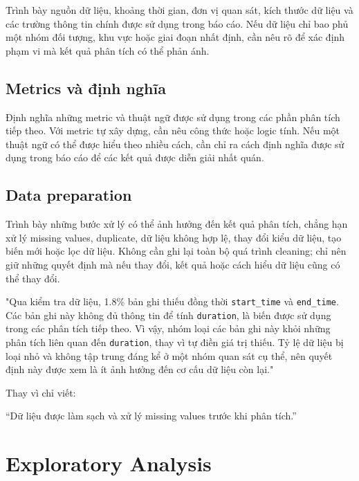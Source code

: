 \documentclass[12pt]{eDA_conquer2026}
\begin{document}
Trình bày nguồn dữ liệu, khoảng thời gian, đơn vị quan sát, kích thước dữ liệu và các trường thông tin chính được sử dụng trong báo cáo. Nếu dữ liệu chỉ bao phủ một nhóm đối tượng, khu vực hoặc giai đoạn nhất định, cần nêu rõ để xác định phạm vi mà kết quả phân tích có thể phản ánh.

\subsection*{Metrics và định nghĩa}

Định nghĩa những metric và thuật ngữ được sử dụng trong các phần phân tích tiếp theo. Với metric tự xây dựng, cần nêu công thức hoặc logic tính. Nếu một thuật ngữ có thể được hiểu theo nhiều cách, cần chỉ ra cách định nghĩa được sử dụng trong báo cáo để các kết quả được diễn giải nhất quán.

\subsection*{Data preparation}

Trình bày những bước xử lý có thể ảnh hưởng đến kết quả phân tích, chẳng hạn xử lý missing values, duplicate, dữ liệu không hợp lệ, thay đổi kiểu dữ liệu, tạo biến mới hoặc lọc dữ liệu. Không cần ghi lại toàn bộ quá trình cleaning; chỉ nên giữ những quyết định mà nếu thay đổi, kết quả hoặc cách hiểu dữ liệu cũng có thể thay đổi.


\begin{aivncodebox}
"Qua kiểm tra dữ liệu, 1.8\% bản ghi thiếu đồng thời \texttt{start\_time} và \texttt{end\_time}. 
Các bản ghi này không đủ thông tin để tính \texttt{duration}, là biến được sử dụng trong các phân tích tiếp theo. 
Vì vậy, nhóm loại các bản ghi này khỏi những phân tích liên quan đến \texttt{duration}, thay vì tự điền giá trị thiếu. 
Tỷ lệ dữ liệu bị loại nhỏ và không tập trung đáng kể ở một nhóm quan sát cụ thể, nên quyết định này được xem là ít ảnh hưởng đến cơ cấu dữ liệu còn lại."


Thay vì chỉ viết:


``Dữ liệu được làm sạch và xử lý missing values trước khi phân tích.''
\end{aivncodebox}




\newpage
\section{Exploratory Analysis}
\end{document}
